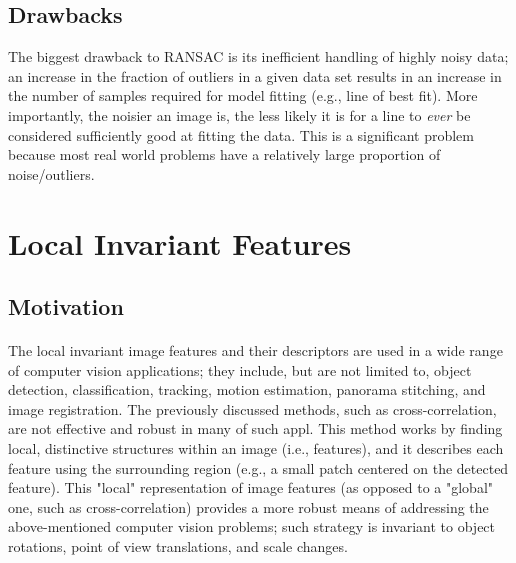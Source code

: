 \documentclass{article}
\begin{document}
\subsection{Drawbacks}
The biggest drawback to RANSAC is its inefficient handling of highly noisy data; an increase in the fraction of outliers in a given data set results in an increase in the number of samples required for model fitting (e.g., line of best fit). More importantly, the noisier an image is, the less likely it is for a line to \textit{ever} be considered sufficiently good at fitting the data. This is a significant problem because most real world problems have a relatively large proportion of noise/outliers.


\section{Local Invariant Features}
\subsection{Motivation}
\paragraph{} The local invariant image features and their descriptors are used in a wide range of computer vision applications; they include, but are not limited to, object detection, classification, tracking, motion estimation, panorama stitching, and image registration. The previously discussed methods, such as cross-correlation, are not effective and robust in many of such appl. This method works by finding local, distinctive structures within an image (i.e., features), and it describes each feature using the surrounding region (e.g., a small patch centered on the detected feature). This "local" representation of image features (as opposed to a "global" one, such as cross-correlation) provides a more robust means of addressing the above-mentioned computer vision problems; such strategy is invariant to object rotations, point of view translations, and scale changes.
\end{document}
